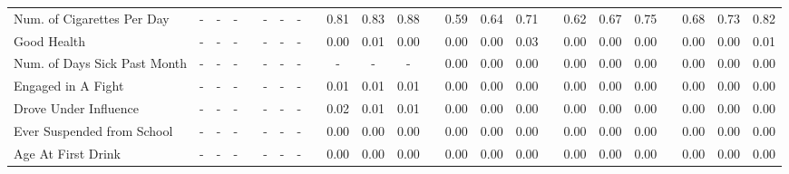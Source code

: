 \begin{center}
{\begin{longtable}{L{12em} c c c p{1.2em} c c c p{1.2em} c c c p{1.2em} c c c p{1.2em} c c c p{1.2em} c c c}
Num. of Cigarettes Per Day & - & - & - & & - & - & - & &      0.81 &      0.83 &      0.88 & &      0.59 &      0.64 &      0.71 & &      0.62 &      0.67 &      0.75 & &      0.68 &      0.73 &      0.82 \\[.3em]
Good Health & - & - & - & & - & - & - & &      0.00 &      0.01 &      0.00 & &      0.00 &      0.00 &      0.03 & &      0.00 &      0.00 &      0.00 & &      0.00 &      0.00 &      0.01 \\[.3em]
Num. of Days Sick Past Month & - & - & - & & - & - & - & & - & - & - & &      0.00 &      0.00 &      0.00 & &      0.00 &      0.00 &      0.00 & &      0.00 &      0.00 &      0.00 \\[.3em]
Engaged in A Fight & - & - & - & & - & - & - & &      0.01 &      0.01 &      0.01 & &      0.00 &      0.00 &      0.00 & &      0.00 &      0.00 &      0.00 & &      0.00 &      0.00 &      0.00 \\[.3em]
Drove Under Influence & - & - & - & & - & - & - & &      0.02 &      0.01 &      0.01 & &      0.00 &      0.00 &      0.00 & &      0.00 &      0.00 &      0.00 & &      0.00 &      0.00 &      0.00 \\[.3em]
Ever Suspended from School & - & - & - & & - & - & - & &      0.00 &      0.00 &      0.00 & &      0.00 &      0.00 &      0.00 & &      0.00 &      0.00 &      0.00 & &      0.00 &      0.00 &      0.00 \\[.3em]
Age At First Drink & - & - & - & & - & - & - & &      0.00 &      0.00 &      0.00 & &      0.00 &      0.00 &      0.00 & &      0.00 &      0.00 &      0.00 & &      0.00 &      0.00 &      0.00 \\[.3em]
\hline
\end{longtable}
}
\end{center}

